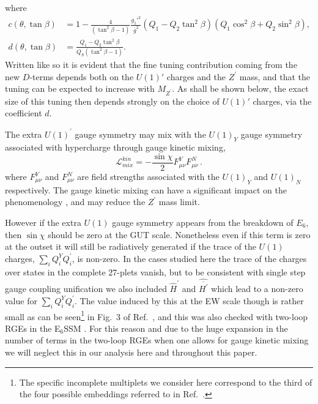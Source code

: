 \documentclass[preprint,amsmath,amssymb,aps,superscriptaddress,prd,
showpacs,floatfix,nofootinbib]{revtex4-1}
\newcommand{\be}{\begin{equation}}
\newcommand{\ee}{\end{equation}}
\begin{document}
where
\begin{align}
c(\theta , \tan\beta) &= 1 - \frac{4}{\left (\tan^2\beta - 1 \right )}
\frac{g_1'^2}{\bar{g}^2} \left (Q_1 - Q_2 \tan^2\beta \right )
\left (Q_1 \cos^2\beta + Q_2 \sin^2\beta \right ) , \label{eq:cdefn} \\
d(\theta , \tan\beta) &= \frac{Q_1 - Q_2 \tan^2\beta}
{Q_S \left (\tan^2\beta - 1\right )} . \label{eq:ddefn}
\end{align}
Written like so it is evident that the fine tuning contribution coming
from the new $D$-terms depends both on the $U(1)'$ charges and the
$Z^\prime$ mass, and that the tuning can be expected to increase with
$M_{Z^\prime}$.  As shall be shown below, the exact size of this tuning
then depends strongly on the choice of $U(1)'$ charges, via the
coefficient $d$.

The extra $U(1)^\prime$ gauge symmetry may mix with the $U(1)_Y$ gauge
symmetry associated with hypercharge through gauge kinetic mixing,
\be
\mathcal{L}_{mix}^{kin}=-\frac{\sin\chi}{2}F^{Y}_{\mu\nu}F^{N}_{\mu\nu}\,.
\label{Eq:GKM}
\ee where $F_{\mu\nu}^Y$ and $F_{\mu\nu}^{N}$ are field strengths
associated with the $U(1)_Y$ and $U(1)_{N}$ respectively.  The gauge
kinetic mixing can have a significant impact on the phenomenology
\cite{Rizzo:1998ut,Salvioni:2009mt,Krauss:2012ku}, and may reduce the
$Z^\prime$ mass limit.

However if the extra $U(1)$ gauge symmetry appears from the
breakdown of $E_6$, then $\sin\chi$ should be zero at the GUT scale.
Nonetheless even if this term is zero at the outset it will still be
radiatively generated if the trace of the $U(1)$ charges, $\sum_i Q_i^Y
Q^\prime_i$, is non-zero.  In the cases studied here the trace of the
charges over states in the complete $27$-plets vanish, but to be
consistent with single step gauge coupling unification we also
included $\hat{H}^\prime$ and $\hat{\overline{H^\prime}}$ which lead
to a non-zero value for $\sum_i Q_i^Y Q^\prime_i $.  The value induced
by this at the EW scale though is rather small as can be
seen\footnote{The specific incomplete multiplets we consider here
  correspond to the third of the four possible embeddings referred to in
  Ref.~\cite{Rizzo:1998ut}.} in Fig.~3 of Ref.~\cite{Rizzo:1998ut}, and this
was also checked
with two-loop RGEs in the E$_6$SSM \cite{King:2005jy,Athron:2009bs}.
For this reason and due to the huge expansion in the number of terms
in the two-loop RGEs when one allows for gauge kinetic mixing we will
neglect this in our analysis here and throughout this paper.
\end{document}
